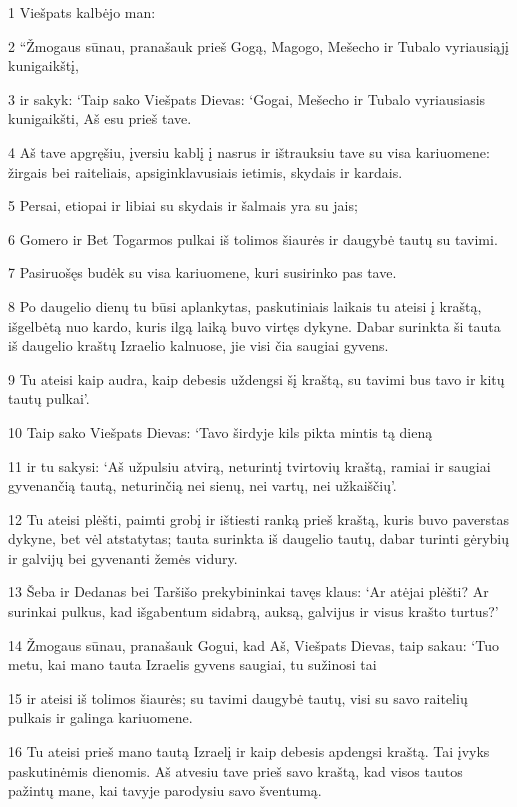 \par 1 Viešpats kalbėjo man: 
\par 2 “Žmogaus sūnau, pranašauk prieš Gogą, Magogo, Mešecho ir Tubalo vyriausiąjį kunigaikštį, 
\par 3 ir sakyk: ‘Taip sako Viešpats Dievas: ‘Gogai, Mešecho ir Tubalo vyriausiasis kunigaikšti, Aš esu prieš tave. 
\par 4 Aš tave apgręšiu, įversiu kablį į nasrus ir ištrauksiu tave su visa kariuomene: žirgais bei raiteliais, apsiginklavusiais ietimis, skydais ir kardais. 
\par 5 Persai, etiopai ir libiai su skydais ir šalmais yra su jais; 
\par 6 Gomero ir Bet Togarmos pulkai iš tolimos šiaurės ir daugybė tautų su tavimi. 
\par 7 Pasiruošęs budėk su visa kariuomene, kuri susirinko pas tave. 
\par 8 Po daugelio dienų tu būsi aplankytas, paskutiniais laikais tu ateisi į kraštą, išgelbėtą nuo kardo, kuris ilgą laiką buvo virtęs dykyne. Dabar surinkta ši tauta iš daugelio kraštų Izraelio kalnuose, jie visi čia saugiai gyvens. 
\par 9 Tu ateisi kaip audra, kaip debesis uždengsi šį kraštą, su tavimi bus tavo ir kitų tautų pulkai’. 
\par 10 Taip sako Viešpats Dievas: ‘Tavo širdyje kils pikta mintis tą dieną 
\par 11 ir tu sakysi: ‘Aš užpulsiu atvirą, neturintį tvirtovių kraštą, ramiai ir saugiai gyvenančią tautą, neturinčią nei sienų, nei vartų, nei užkaiščių’. 
\par 12 Tu ateisi plėšti, paimti grobį ir ištiesti ranką prieš kraštą, kuris buvo paverstas dykyne, bet vėl atstatytas; tauta surinkta iš daugelio tautų, dabar turinti gėrybių ir galvijų bei gyvenanti žemės vidury. 
\par 13 Šeba ir Dedanas bei Taršišo prekybininkai tavęs klaus: ‘Ar atėjai plėšti? Ar surinkai pulkus, kad išgabentum sidabrą, auksą, galvijus ir visus krašto turtus?’ 
\par 14 Žmogaus sūnau, pranašauk Gogui, kad Aš, Viešpats Dievas, taip sakau: ‘Tuo metu, kai mano tauta Izraelis gyvens saugiai, tu sužinosi tai 
\par 15 ir ateisi iš tolimos šiaurės; su tavimi daugybė tautų, visi su savo raitelių pulkais ir galinga kariuomene. 
\par 16 Tu ateisi prieš mano tautą Izraelį ir kaip debesis apdengsi kraštą. Tai įvyks paskutinėmis dienomis. Aš atvesiu tave prieš savo kraštą, kad visos tautos pažintų mane, kai tavyje parodysiu savo šventumą. 
